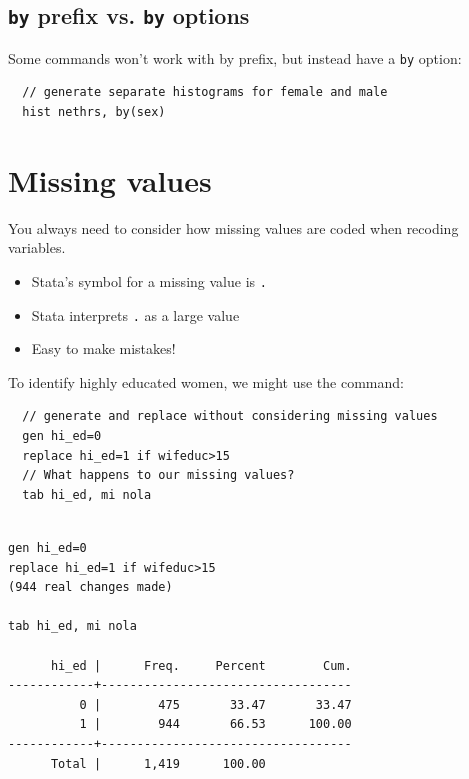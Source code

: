 \documentclass[]{book}
\providecommand{\tightlist}{%
  \setlength{\itemsep}{0pt}\setlength{\parskip}{0pt}}
\begin{document}
\hypertarget{by-prefix-vs.-by-options}{%
\subsection{\texorpdfstring{\texttt{by} prefix vs. \texttt{by} options}{by prefix vs. by options}}\label{by-prefix-vs.-by-options}}

Some commands won't work with by prefix, but instead have a \texttt{by} option:

\begin{verbatim}
  // generate separate histograms for female and male 
  hist nethrs, by(sex)
\end{verbatim}

\hypertarget{missing-values}{%
\section{Missing values}\label{missing-values}}

You always need to consider how missing values are coded when recoding variables.

\begin{itemize}
\tightlist
\item
  Stata's symbol for a missing value is \texttt{.}
\item
  Stata interprets \texttt{.} as a large value
\item
  Easy to make mistakes!
\end{itemize}

To identify highly educated women, we might use the command:

\begin{verbatim}
  // generate and replace without considering missing values
  gen hi_ed=0
  replace hi_ed=1 if wifeduc>15
  // What happens to our missing values?
  tab hi_ed, mi nola
\end{verbatim}

\begin{verbatim}

gen hi_ed=0
replace hi_ed=1 if wifeduc>15
(944 real changes made)

tab hi_ed, mi nola

      hi_ed |      Freq.     Percent        Cum.
------------+-----------------------------------
          0 |        475       33.47       33.47
          1 |        944       66.53      100.00
------------+-----------------------------------
      Total |      1,419      100.00
\end{verbatim}
\end{document}

